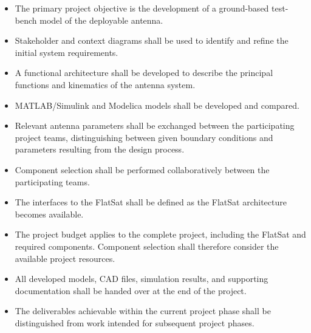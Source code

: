 \begin{itemize}
	\item The primary project objective is the development of a ground-based
	test-bench model of the deployable antenna.
	
	\item Stakeholder and context diagrams shall be used to identify and
	refine the initial system requirements.
	
	\item A functional architecture shall be developed to describe the
	principal functions and kinematics of the antenna system.
	
	\item MATLAB/Simulink and Modelica models shall be developed and compared.
	
	\item Relevant antenna parameters shall be exchanged between the
	participating project teams, distinguishing between given boundary
	conditions and parameters resulting from the design process.
	
	\item Component selection shall be performed collaboratively between the
	participating teams.
	
	\item The interfaces to the FlatSat shall be defined as the FlatSat
	architecture becomes available.
	
	\item The project budget applies to the complete project, including the
	FlatSat and required components. Component selection shall therefore
	consider the available project resources.
	
	\item All developed models, CAD files, simulation results, and supporting
	documentation shall be handed over at the end of the project.
	
	\item The deliverables achievable within the current project phase shall
	be distinguished from work intended for subsequent project phases.
\end{itemize}

\newpage